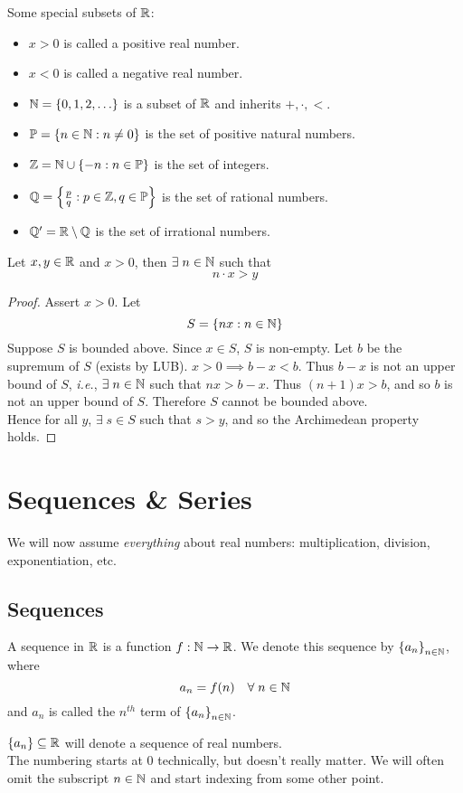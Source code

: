 \documentclass[12pt]{article}
\begin{document}
Some special subsets of $\mathbb{R}$:
\begin{itemize}
    \item $x > 0$ is called a positive real number.
    \item $x < 0$ is called a negative real number.
    \item $\N = \set{0, 1, 2, \dots}$ is a subset of $\mathbb{R}$ and inherits $+, \cdot, <$.
    \item $\P = \set{n \in \N : n \neq 0}$ is the set of positive natural numbers.
    \item $\Z = \N \cup \set{-n : n \in \P}$ is the set of integers.
    \item $\Q = \set{\frac{p}{q} : p \in \Z, q \in \P}$ is the set of rational numbers.
    \item $\mathbb{Q}' = \mathbb{R} \setminus \mathbb{Q}$ is the set of irrational numbers.
\end{itemize}

\begin{thm} \label{thm:archimedean}
    Let $x, y \in \mathbb{R}$ and $x > 0$, then $\exists\; n \in \mathbb{N}$ such that \[
        n \cdot x > y
    \]
\end{thm}
\begin{proof}
    Assert $x > 0$. Let \[
        S = \set{nx : n \in \N}
    \]
    Suppose $S$ is bounded above. Since $x \in S$, $S$ is non-empty. Let $b$ be the supremum of $S$ (exists by LUB). $x > 0 \implies b - x < b$. Thus $b - x$ is not an upper bound of $S$, \textit{i.e.}, $\exists\; n \in \mathbb{N}$ such that $nx > b - x$. Thus $(n + 1)x > b$, and so $b$ is not an upper bound of $S$. Therefore $S$ cannot be bounded above. \\
    Hence for all $y$, $\exists\; s \in S$ such that $s > y$, and so the Archimedean property holds.
\end{proof}

\section{Sequences \& Series}
We will now assume \emph{everything} about real numbers: multiplication, division, exponentiation, etc.

\subsection{Sequences}
\begin{defn} \label{defn:sequence}
    A sequence in $\mathbb{R}$ is a function $f: \mathbb{N} \to \mathbb{R}$. We denote this sequence by $\set{a_{n}}_{n \in \N}$, where \[
        a_{n} = f(n) \quad \forall\; n \in \mathbb{N}
    \] and $a_{n}$ is called the $n^{th}$ term of $\set{a_{n}}_{n \in \N}$.
\end{defn}
\begin{rem}
    $\set{a_{n}} \subseteq \R$ will denote a sequence of real numbers. \\
    The numbering starts at 0 technically, but doesn't really matter. We will often omit the subscript $n \in \mathbb{N}$ and start indexing from some other point.
\end{rem}
\end{document}
